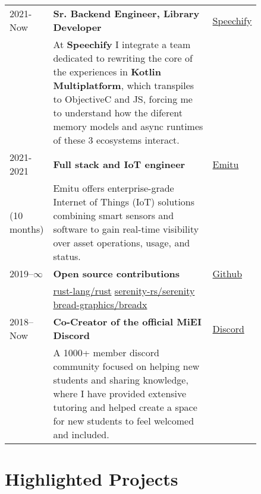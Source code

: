 \documentclass{article}
\begin{document}
\begin{tabular}{p{0.11\linewidth}p{0.73\linewidth}l}
    2021-Now & \textbf{Sr. Backend Engineer, Library Developer} & \href{https://speechify.com}{Speechify} \\
    & At \textbf{Speechify} I integrate a team dedicated to rewriting the core
    of the experiences in \textbf{Kotlin Multiplatform}, which transpiles to
    ObjectiveC and JS, forcing me to understand how the diferent memory models
    and async runtimes of these 3 ecosystems interact. & \\

    2021-2021 & \textbf{Full stack and IoT engineer} & \href{https://emitu.com}{Emitu} \\
    (10 months) &
        Emitu offers enterprise-grade Internet of Things (IoT) solutions combining
        smart sensors and software to gain real-time visibility over asset
        operations, usage, and status. & \\

    2019--$\infty$ & \textbf{Open source contributions} & \href{https://github.com}{Github} \\
    &
        \href{https://github.com/rust-lang/rust/pulls?q=author\%3Amendess+}
            {rust-lang/rust}
        \hspace{2em}
        \href{https://github.com/serenity-rs/serenity/pulls?q=author\%3Amendess+}
            {serenity-rs/serenity}
        \hspace{2em}
        \href{https://github.com/bread-graphics/breadx/pulls?q=author\%3Amendess+}
            {bread-graphics/breadx} & \\

    2018--Now & \textbf{Co-Creator of the official MiEI Discord} & \href{discord.com}{Discord} \\
    &
        A 1000+ member discord community focused on helping new students and
        sharing knowledge, where I have provided extensive tutoring and helped
        create a space for new students to feel welcomed and included. & \\

\end{tabular}

\section{Highlighted Projects}

\begin{tabular}{p{0.11\linewidth}p{0.73\linewidth}l}
\end{tabular}
\end{document}
